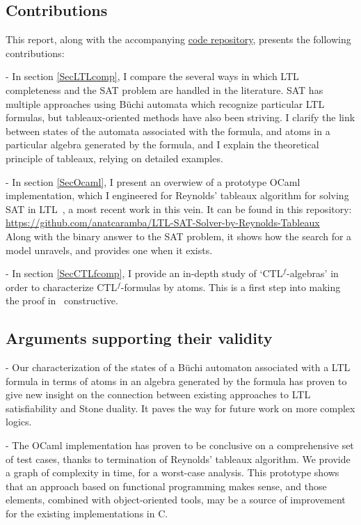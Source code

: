 \documentclass[11pt]{article}
\newcommand{\CTLf}{{CTL$^f$}}
\def\CC{{C\nolinebreak[4]\hspace{-.05em}\raisebox{.4ex}{\tiny\bf ++}}}
\theoremstyle{definition}
\begin{document}
\subsection*{Contributions}
This report, along with the accompanying \href{https://github.com/anatcaramba/LTL-SAT-Solver-by-Reynolds-Tableaux}{code repository},
presents the following contributions:

- In section \ref*{SecLTLcomp}, I compare the several ways in which
LTL completeness
and the SAT problem are handled
in the literature. SAT has 
multiple approaches using Büchi automata which recognize particular
LTL formulas, but tableaux-oriented methods have also been striving. 
I clarify the link between states
of the automata associated with the formula,
and atoms in a particular algebra generated by the formula, and I explain the theoretical principle of tableaux, relying on detailed examples.


- In section \ref*{SecOcaml}, I present an overwiew of a prototype OCaml implementation, which I engineered
for Reynolds' tableaux
algorithm for solving SAT in LTL~\cite{ReyLTL}, a most recent work in this vein. It can be found in this repository:\\

\href{https://github.com/anatcaramba/LTL-SAT-Solver-by-Reynolds-Tableaux}{https://github.com/anatcaramba/LTL-SAT-Solver-by-Reynolds-Tableaux}\\

Along with the binary answer to the SAT problem, it shows how
the search for a model unravels, and provides one when it exists.


- In section \ref*{SecCTLfcomp}, I provide an in-depth study of `{\CTLf}-algebras'  
in order to characterize
{\CTLf}-formulas by atoms. This is a first step into making the 
proof in~\cite{GhivG16} constructive.



\subsection*{Arguments supporting their validity}

- Our characterization of the states of a Büchi automaton associated with a LTL formula in terms of atoms in an algebra generated by the formula 
has proven to give new insight on the connection between existing approaches to LTL satisfiability and Stone duality. It paves the way 
for future work on more complex logics.

- The OCaml implementation has proven to be conclusive on a comprehensive set of test cases, 
thanks to termination of Reynolds' tableaux algorithm. We provide a graph of complexity in time,
for a worst-case analysis. This prototype shows that an approach based on functional programming makes sense, and those elements,
combined with object-oriented tools, may be a source of improvement for the existing implementations in \CC.
\end{document}
